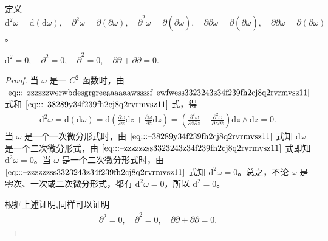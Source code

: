 \documentclass[../../main.tex]{subfiles}%
\begin{document}
\begin{definition}
定义 \( \mathrm{d}^2\omega = \mathrm{d}(\mathrm{d}\omega),\quad \partial^2\omega = \partial(\partial\omega),\quad \bar{\partial}^2\omega = \bar{\partial}(\bar{\partial}\omega),\quad \partial\bar{\partial}\omega = \partial(\bar{\partial}\omega) ,\quad \bar{\partial}\partial\omega = \bar{\partial}(\partial\omega) \)。
\end{definition}

\begin{proposition}
$\mathrm{d}^2 = 0 , \quad\partial^2 = 0, \quad
\bar{\partial}^2 = 0, \quad
\bar{\partial}\partial + \partial\bar{\partial} = 0.$
\end{proposition}
\begin{proof}

当 \( \omega \) 是一 \( C^2 \) 函数时，由 \(\eqref{eq:::--zzzzzzwerwbdesgrgreeaaaaaawssssf--ewfwess3323243z34f239fh2cj8q2rvrmvsz11}\) 式和 \(\eqref{eq:::--38289y34f239fh2cj8q2rvrmvsz11}\) 式，得
\begin{align*}
\mathrm{d}^2\omega = \mathrm{d}(\mathrm{d}\omega) = \mathrm{d}\left( \frac{\partial \omega}{\partial z}\mathrm{d}z + \frac{\partial \omega}{\partial \bar{z}}\mathrm{d}\bar{z} \right) = \left( \frac{\partial^2 \omega}{\partial \bar{z}\partial z} - \frac{\partial^2 \omega}{\partial z\partial \bar{z}} \right) \mathrm{d}z \wedge \mathrm{d}\bar{z} = 0. 
\end{align*}
当 \( \omega \) 是一个一次微分形式时，由 \(\eqref{eq:::--38289y34f239fh2cj8q2rvrmvsz11}\) 式知 \( \mathrm{d}\omega \) 是一个二次微分形式，由 \(\eqref{eq:::--zzzzzzss3323243z34f239fh2cj8q2rvrmvsz11}\) 式即知 \( \mathrm{d}^2\omega = 0 \)。当 \( \omega \) 是一个二次微分形式时，由 \(\eqref{eq:::--zzzzzzss3323243z34f239fh2cj8q2rvrmvsz11}\) 式知 \( \mathrm{d}^2\omega = 0 \)。总之，不论 \( \omega \) 是零次、一次或二次微分形式，都有 \( \mathrm{d}^2\omega = 0 \)，所以 \( \mathrm{d}^2 = 0 \)。

根据上述证明,同样可以证明
\begin{align*}
\partial^2 = 0, \quad
\bar{\partial}^2 = 0, \quad
\bar{\partial}\partial + \partial\bar{\partial} = 0. 
\end{align*}

\end{proof}
\end{document}
